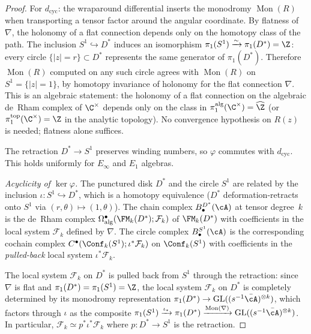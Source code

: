 \begin{proof}
For $d_{\mathrm{cyc}}$: the wraparound differential inserts
the monodromy $\operatorname{Mon}(R)$ when transporting a tensor
factor around the angular coordinate. By flatness of $\nabla$,
the holonomy of a flat connection depends only on the homotopy
class of the path. The inclusion $S^1\hookrightarrow D^*$ induces
an isomorphism $\pi_1(S^1)\xrightarrow{\sim}\pi_1(D^*)=\Z$: every
circle $\{|z|=r\}\subset D^*$ represents the same generator of
$\pi_1(D^*)$. Therefore $\operatorname{Mon}(R)$ computed on any
such circle agrees with $\operatorname{Mon}(R)$ on $S^1=\{|z|=1\}$,
by homotopy invariance of holonomy for the flat connection $\nabla$.
This is an algebraic statement: the holonomy of a flat connection
on the algebraic de~Rham complex of $\C^\times$ depends only on
the class in $\pi_1^{\mathrm{alg}}(\C^\times)=\widehat{\Z}$
(or $\pi_1^{\mathrm{top}}(\C^\times)=\Z$ in the analytic
topology). No convergence hypothesis on $R(z)$ is needed;
flatness alone suffices.

The retraction $D^*\to S^1$ preserves winding numbers, so
$\varphi$ commutes with $d_{\mathrm{cyc}}$. This holds
uniformly for $E_\infty$ and $E_1$ algebras.

\emph{Acyclicity of $\ker\varphi$.}
The punctured disk $D^*$ and the circle $S^1$ are related by
the inclusion $\iota\colon S^1\hookrightarrow D^*$, which is a
homotopy equivalence ($D^*$ deformation-retracts onto $S^1$
via $(r,\theta)\mapsto(1,\theta)$). The chain complex
$B^{D^*}_\bullet(\cA)$ at tensor degree~$k$ is the de~Rham
complex $\Omega^\bullet_{\mathrm{alg}}(\FM_k(D^*);
\mathcal{F}_k)$ of $\FM_k(D^*)$ with coefficients in the
local system $\mathcal{F}_k$ defined by $\nabla$. The circle
complex $B^{S^1}_\bullet(\cA)$ is the corresponding cochain
complex $C^\bullet(\Conf_k(S^1);\iota^*\mathcal{F}_k)$ on
$\Conf_k(S^1)$ with coefficients in the
\emph{pulled-back} local system $\iota^*\mathcal{F}_k$.

The local system $\mathcal{F}_k$ on $D^*$ is pulled back from
$S^1$ through the retraction: since $\nabla$ is flat and
$\pi_1(D^*)=\pi_1(S^1)=\Z$, the local system $\mathcal{F}_k$
on $D^*$ is completely determined by its monodromy
representation $\pi_1(D^*)\to\operatorname{GL}
((s^{-1}\bar\cA)^{\otimes k})$, which factors through $\iota$
as the composite $\pi_1(S^1)\xrightarrow{\iota_*}
\pi_1(D^*)\xrightarrow{\operatorname{Mon}(\nabla)}
\operatorname{GL}((s^{-1}\bar\cA)^{\otimes k})$. In
particular, $\mathcal{F}_k\simeq p^*\iota^*\mathcal{F}_k$
where $p\colon D^*\to S^1$ is the retraction.


\end{proof}
